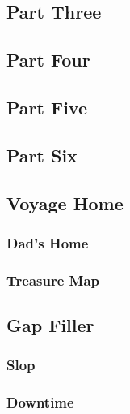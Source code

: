 \subsection{Part Three}


\subsection{Part Four}


\subsection{Part Five}


\subsection{Part Six}


\subsection{Voyage Home}


\subsubsection{Dad's Home}


\subsubsection{Treasure Map}


\subsection{Gap Filler}


\subsubsection{Slop}


\subsubsection{Downtime}

